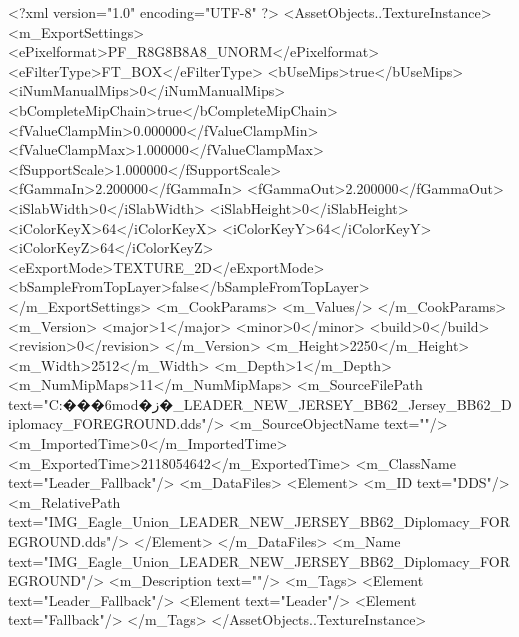 <?xml version="1.0" encoding="UTF-8" ?>
<AssetObjects..TextureInstance>
	<m_ExportSettings>
		<ePixelformat>PF_R8G8B8A8_UNORM</ePixelformat>
		<eFilterType>FT_BOX</eFilterType>
		<bUseMips>true</bUseMips>
		<iNumManualMips>0</iNumManualMips>
		<bCompleteMipChain>true</bCompleteMipChain>
		<fValueClampMin>0.000000</fValueClampMin>
		<fValueClampMax>1.000000</fValueClampMax>
		<fSupportScale>1.000000</fSupportScale>
		<fGammaIn>2.200000</fGammaIn>
		<fGammaOut>2.200000</fGammaOut>
		<iSlabWidth>0</iSlabWidth>
		<iSlabHeight>0</iSlabHeight>
		<iColorKeyX>64</iColorKeyX>
		<iColorKeyY>64</iColorKeyY>
		<iColorKeyZ>64</iColorKeyZ>
		<eExportMode>TEXTURE_2D</eExportMode>
		<bSampleFromTopLayer>false</bSampleFromTopLayer>
	</m_ExportSettings>
	<m_CookParams>
		<m_Values/>
	</m_CookParams>
	<m_Version>
		<major>1</major>
		<minor>0</minor>
		<build>0</build>
		<revision>0</revision>
	</m_Version>
	<m_Height>2250</m_Height>
	<m_Width>2512</m_Width>
	<m_Depth>1</m_Depth>
	<m_NumMipMaps>11</m_NumMipMaps>
	<m_SourceFilePath text="C:\Users\jjj\Desktop\����6mod�ز�\IMG_LEADER_NEW_JERSEY_BB62_Jersey_BB62_Diplomacy_FOREGROUND.dds"/>
	<m_SourceObjectName text=""/>
	<m_ImportedTime>0</m_ImportedTime>
	<m_ExportedTime>2118054642</m_ExportedTime>
	<m_ClassName text="Leader_Fallback"/>
	<m_DataFiles>
		<Element>
			<m_ID text="DDS"/>
			<m_RelativePath text="IMG_Eagle_Union_LEADER_NEW_JERSEY_BB62_Diplomacy_FOREGROUND.dds"/>
		</Element>
	</m_DataFiles>
	<m_Name text="IMG_Eagle_Union_LEADER_NEW_JERSEY_BB62_Diplomacy_FOREGROUND"/>
	<m_Description text=""/>
	<m_Tags>
		<Element text="Leader_Fallback"/>
		<Element text="Leader"/>
		<Element text="Fallback"/>
	</m_Tags>
</AssetObjects..TextureInstance>


